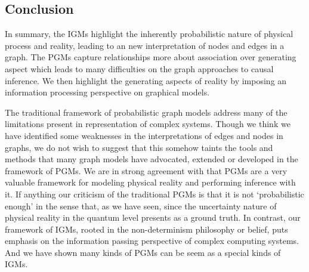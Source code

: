 \documentclass{article}
\theoremstyle{definition}
\theoremstyle{remark}
\theoremstyle{definition}
\begin{document}
\begin{CJK*}{UTF8}{gbsn}
\section{Conclusion}

In summary, the IGMs highlight the inherently probabilistic nature of physical process and reality, leading to an new interpretation of nodes and edges in a graph. The PGMs capture relationships more about association over generating aspect which leads to many difficulties on the graph approaches to causal inference. We then highlight the generating aspects of reality by imposing an information processing perspective on graphical models.


The traditional framework of probabilistic graph models address many of the limitations present in representation of complex systems. Though we think we have identified some weaknesses in the interpretations of edges and nodes in graphs, we do not wish to suggest that this somehow taints the tools and methods that many graph models have advocated, extended or developed in the framework of PGMs. We are in strong agreement with that PGMs are a very valuable framework for modeling physical reality and performing inference with it. If anything our criticism of the traditional PGMs is that it is not ‘probabilistic enough’ in the sense that, as we have seen, since the uncertainty nature of physical reality in the quantum level presents as a ground truth. In contrast, our framework of IGMs, rooted in the non-determinism philosophy or belief, puts emphasis on the information passing perspective of complex computing systems. And we have shown many kinds of PGMs can be seem as a special kinds of IGMs.




{\small


}

\end{CJK*}
\end{document}
